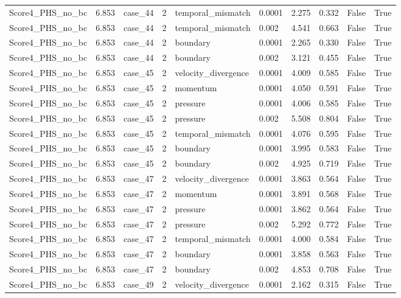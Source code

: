 \begin{longtable}{llllllllll}
Score4\_PHS\_no\_bc & 6.853 & case\_44 & 2 & temporal\_mismatch & 0.0001 & 2.275 & 0.332 & False & True \\
Score4\_PHS\_no\_bc & 6.853 & case\_44 & 2 & temporal\_mismatch & 0.002 & 4.541 & 0.663 & False & True \\
Score4\_PHS\_no\_bc & 6.853 & case\_44 & 2 & boundary & 0.0001 & 2.265 & 0.330 & False & True \\
Score4\_PHS\_no\_bc & 6.853 & case\_44 & 2 & boundary & 0.002 & 3.121 & 0.455 & False & True \\
Score4\_PHS\_no\_bc & 6.853 & case\_45 & 2 & velocity\_divergence & 0.0001 & 4.009 & 0.585 & False & True \\
Score4\_PHS\_no\_bc & 6.853 & case\_45 & 2 & momentum & 0.0001 & 4.050 & 0.591 & False & True \\
Score4\_PHS\_no\_bc & 6.853 & case\_45 & 2 & pressure & 0.0001 & 4.006 & 0.585 & False & True \\
Score4\_PHS\_no\_bc & 6.853 & case\_45 & 2 & pressure & 0.002 & 5.508 & 0.804 & False & True \\
Score4\_PHS\_no\_bc & 6.853 & case\_45 & 2 & temporal\_mismatch & 0.0001 & 4.076 & 0.595 & False & True \\
Score4\_PHS\_no\_bc & 6.853 & case\_45 & 2 & boundary & 0.0001 & 3.995 & 0.583 & False & True \\
Score4\_PHS\_no\_bc & 6.853 & case\_45 & 2 & boundary & 0.002 & 4.925 & 0.719 & False & True \\
Score4\_PHS\_no\_bc & 6.853 & case\_47 & 2 & velocity\_divergence & 0.0001 & 3.863 & 0.564 & False & True \\
Score4\_PHS\_no\_bc & 6.853 & case\_47 & 2 & momentum & 0.0001 & 3.891 & 0.568 & False & True \\
Score4\_PHS\_no\_bc & 6.853 & case\_47 & 2 & pressure & 0.0001 & 3.862 & 0.564 & False & True \\
Score4\_PHS\_no\_bc & 6.853 & case\_47 & 2 & pressure & 0.002 & 5.292 & 0.772 & False & True \\
Score4\_PHS\_no\_bc & 6.853 & case\_47 & 2 & temporal\_mismatch & 0.0001 & 4.000 & 0.584 & False & True \\
Score4\_PHS\_no\_bc & 6.853 & case\_47 & 2 & boundary & 0.0001 & 3.858 & 0.563 & False & True \\
Score4\_PHS\_no\_bc & 6.853 & case\_47 & 2 & boundary & 0.002 & 4.853 & 0.708 & False & True \\
Score4\_PHS\_no\_bc & 6.853 & case\_49 & 2 & velocity\_divergence & 0.0001 & 2.162 & 0.315 & False & True \\

\end{longtable}
